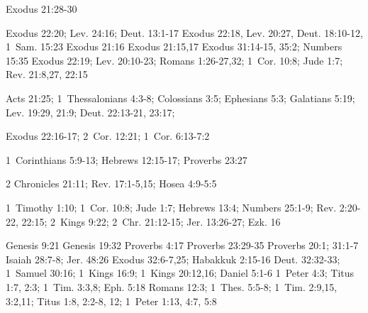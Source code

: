 {\begin{multicols*}{3}
{ 
    Exodus 21:28-30
    
    Exodus 22:20;
    Lev. 24:16;
    Deut. 13:1-17
    Exodus 22:18, Lev. 20:27, Deut. 18:10-12, 1~Sam. 15:23
    Exodus 21:16
    Exodus 21:15,17
    Exodus 31:14-15, 35:2;
    Numbers 15:35
    Exodus 22:19;
    Lev. 20:10-23;
    Romans 1:26-27,32; 
    1~Cor. 10:8;
    Jude 1:7;
    Rev. 21:8,27, 22:15

{}
    Acts 21:25;
    1~Thessalonians 4:3-8;
    Colossians 3:5;
    Ephesians 5:3;
    Galatians 5:19;
    Lev. 19:29, 21:9;
    Deut. 22:13-21, 23:17;
    
 Exodus 22:16-17;
    2~Cor. 12:21;
    1~Cor. 6:13-7:2
   
    1~Corinthians 5:9-13;
    Hebrews 12:15-17;
    Proverbs 23:27
    
    2 Chronicles 21:11;
    Rev. 17:1-5,15;
    Hosea 4:9-5:5
    
    1~Timothy 1:10;
    1~Cor. 10:8;
    Jude 1:7;
    Hebrews 13:4;
    Numbers 25:1-9;
    Rev. 2:20-22, 22:15;
    2~Kings 9:22;
    2~Chr. 21:12-15;
    Jer. 13:26-27;
    Ezk. 16
    
 Genesis 9:21
 Genesis 19:32
 Proverbs 4:17
 Proverbs 23:29-35
 Proverbs 20:1; 31:1-7
 Isaiah 28:7-8; Jer. 48:26
 Exodus 32:6-7,25; Habakkuk 2:15-16
 Deut. 32:32-33; 1~Samuel 30:16; 1~Kings 16:9; 1~Kings 20:12,16; Daniel 5:1-6
 1~Peter 4:3; Titus 1:7, 2:3; 1~Tim. 3:3,8; Eph. 5:18
 Romans 12:3; 1~Thes. 5:5-8; 1~Tim. 2:9,15, 3:2,11; Titus 1:8, 2:2-8, 12; 1~Peter 1:13, 4:7, 5:8



}\end{multicols*}
\setlength{\parindent}{1em}
}


